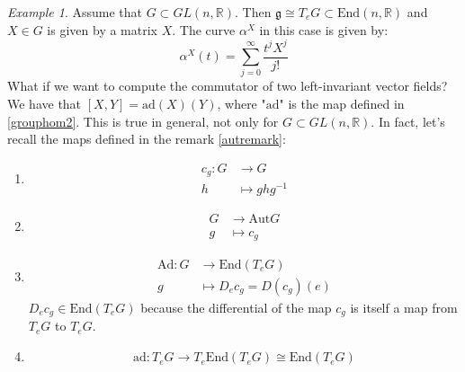 \documentclass[a4paper,11pt,titlepage, article, oneside]{memoir}
\numberwithin{equation}{section}
\theoremstyle{definition}
\theoremstyle{remark}
\newtheorem{example}[theorem]{Example}
\newcommand{\rfield}{\mathbb{R}}
\newcommand{\lie}[1]{\mathfrak{#1}}
\begin{document}
\begin{tcolorbox}
\begin{example}
Assume that  $G \subset GL(n, \rfield)$. Then $\lie{g} \cong T_e G \subset \text{End}(n, \rfield)$ and $X \in G$ is given by a matrix $X$. The curve $\alpha^X$ in this case is given by:
\begin{equation} \label{expmatrix}
\alpha^X(t) = \sum\limits_{j=0}^{\infty} \frac{t^j X^j}{j!}
\end{equation}
What if we want to compute the commutator of two left-invariant vector fields? We have that $[X, Y] = \text{ad}(X)(Y)$, where "$\text{ad}$" is the map defined in \eqref{grouphom2}. This is true in general, not only for $G \subset GL(n, \rfield)$. In fact, let's recall the maps defined in the remark \ref{autremark}:
\begin{enumerate}
\item \begin{align}
c_g \colon G &\rightarrow G \\
h &\mapsto ghg^{-1} \nonumber
\end{align}
\item \begin{align}
G &\rightarrow \text{Aut}G \\
g &\mapsto c_g \nonumber
\end{align}
\item \begin{align}
\text{Ad} \colon G &\rightarrow \text{End}(T_e G) \\
g &\mapsto D_e c_g = D(c_g)(e) \nonumber
\end{align}
$D_e c_g \in \text{End}(T_e G)$ because the differential of the map $c_g$ is itself a map from $T_e G$ to $T_e G$.
\item \begin{equation}
\text{ad} \colon T_e G \rightarrow T_e \text{End}(T_e G) \cong \text{End}(T_e G)
\end{equation}




\end{enumerate}
\end{example}
\end{tcolorbox}
\end{document}
